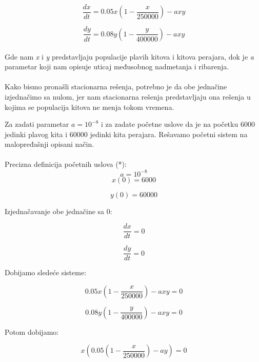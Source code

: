 \documentclass[a4paper]{article}
\begin{document}
{	\begin{equation}
		\frac{dx}{dt} = 0.05x(1 - \frac{x}{250000}) - axy
	\end{equation}
	
	\begin{equation}
		\frac{dy}{dt} = 0.08y(1 - \frac{y}{400000}) - axy
	\end{equation}
	\\
	Gde nam \textit{x} i \textit{y} predstavljaju populacije plavih kitova i kitova perajara, dok je \textit{a} parametar koji nam opisuje uticaj međusobnog nadmetanja i ribarenja.\\ 
	\\
	Kako bismo pronašli stacionarna rešenja, potrebno je da obe jednačine izjednačimo sa nulom, jer nam stacionarna rešenja predstavljaju ona rešenja u kojima se populacija kitova ne menja tokom vremena.\\
	
	\newpage
	
	Za zadati parametar $a = 10^{-8} $ i za zadate početne uslove da je na početku 6000 jedinki plavog kita i 60000 jedinki kita perajara. Rešavamo početni sistem na malopređašnji opisani način. \\ 
	\\

	Precizna definicija početnih uslova (*): \\
	\[
		a = 10^{-8}
	\]
	\[
		x(0) = 6000
	\]

	\[
		y(0) = 60 000
	\]
	
	Izjednačavanje obe jednačine sa 0:
	
	\begin{equation}
		\frac{dx}{dt} = 0 
	\end{equation}

	\begin{equation}
		\frac{dy}{dt} = 0
	\end{equation}
	
	Dobijamo sledeće sisteme:
	
	\begin{equation}
		0.05x(1 - \frac{x}{250000}) - axy = 0
	\end{equation}
	
	\begin{equation}
		0.08y(1 - \frac{y}{400000}) - axy = 0
	\end{equation}
		
	Potom dobijamo:
	
	\[
		x(0.05(1 - \frac{x}{250000}) - ay) = 0
	\]
	
}
\end{document}
